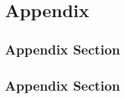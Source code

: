 \documentclass[runningheads]{llncs}
\begin{document}
\newpage














\newpage




\appendix
\section{Appendix}
\label{sec:appendix}

\subsection{Appendix Section}
\label{sec:appendix-section}

\subsection{Appendix Section}
\label{sec:appendix-section-2}
\end{document}
